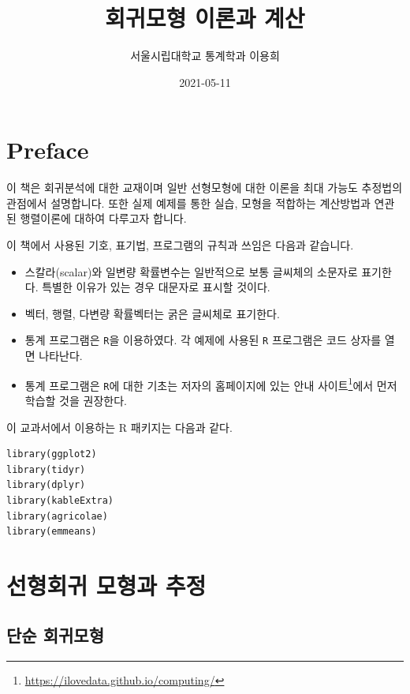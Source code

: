 \documentclass[
]{book}
\title{회귀모형 이론과 계산}
\author{서울시립대학교 통계학과 이용희}
\date{2021-05-11}
\makeatletter
\providecommand{\tightlist}{%
  \setlength{\itemsep}{0pt}\setlength{\parskip}{0pt}}
\renewcommand{\href}[2]{#2\footnote{\url{#1}}}
\newenvironment{kframe}{%
\medskip{}
\setlength{\fboxsep}{.8em}
 \def\at@end@of@kframe{}%
 \ifinner\ifhmode%
  \def\at@end@of@kframe{\end{minipage}}%
  \begin{minipage}{\columnwidth}%
 \fi\fi%
 \def\FrameCommand##1{\hskip\@totalleftmargin \hskip-\fboxsep
 \colorbox{shadecolor}{##1}\hskip-\fboxsep
     \hskip-\linewidth \hskip-\@totalleftmargin \hskip\columnwidth}%
 \MakeFramed {\advance\hsize-\width
   \@totalleftmargin\z@ \linewidth\hsize
   \@setminipage}}%
 {\par\unskip\endMakeFramed%
 \at@end@of@kframe}
\newenvironment{rmdblock}[1]
  {
  \begin{itemize}
  \renewcommand{\labelitemi}{
    \raisebox{-.7\height}[0pt][0pt]{
      {\setkeys{Gin}{width=3em,keepaspectratio}\texttt{[image: images/\#1]}}
    }
  }
  \setlength{\fboxsep}{1em}
  \begin{kframe}
  \item
  }
  {
  \end{kframe}
  \end{itemize}
  }
\newenvironment{rmdimportant}
  {\begin{rmdblock}{important}}
  {\end{rmdblock}}
\theoremstyle{definition}
\theoremstyle{definition}
\theoremstyle{definition}
\theoremstyle{definition}
\theoremstyle{remark}
\makeatother
\begin{document}
\maketitle

{
\setcounter{tocdepth}{1}
\tableofcontents
}
\hypertarget{preface}{%
\chapter*{Preface}\label{preface}}


이 책은 회귀분석에 대한 교재이며 일반 선형모형에 대한 이론을 최대 가능도 추정법의 관점에서 설명합니다. 또한 실제 예제를 통한 실습, 모형을 적합하는 계산방법과 연관된 행렬이론에 대하여 다루고자 합니다.

\begin{rmdimportant}
이 책에서 사용된 기호, 표기법, 프로그램의 규칙과 쓰임은 다음과 같습니다.

\begin{itemize}
\tightlist
\item
  스칼라(scalar)와 일변량 확률변수는 일반적으로 보통 글씨체의 소문자로 표기한다. 특별한 이유가 있는 경우 대문자로 표시할 것이다.
\item
  벡터, 행렬, 다변량 확률벡터는 굵은 글씨체로 표기한다.
\item
  통계 프로그램은 \texttt{R}을 이용하였다. 각 예제에 사용된 \texttt{R} 프로그램은 코드 상자를 열면 나타난다.
\item
  통계 프로그램은 \texttt{R}에 대한 기초는 저자의 홈페이지에 있는 \href{https://ilovedata.github.io/computing/}{안내 사이트}에서 먼저 학습할 것을 권장한다.
\end{itemize}
\end{rmdimportant}

이 교과서에서 이용하는 R 패키지는 다음과 같다.

\begin{verbatim}
library(ggplot2)
library(tidyr)
library(dplyr)
library(kableExtra)
library(agricolae)
library(emmeans)
\end{verbatim}

\mainmatter

\hypertarget{lse}{%
\chapter{선형회귀 모형과 추정}\label{lse}}

\hypertarget{uxb2e8uxc21c-uxd68cuxadc0uxbaa8uxd615}{%
\section{단순 회귀모형}\label{uxb2e8uxc21c-uxd68cuxadc0uxbaa8uxd615}}
\end{document}
